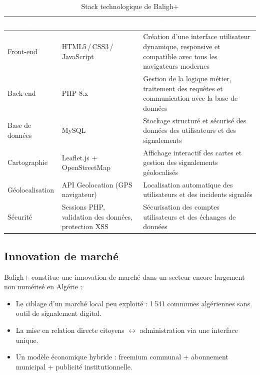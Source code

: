 \documentclass[12pt,a4paper]{report}
\newcommand{\thdcell}[1]{%
  \cellcolor{tabhead}\textbf{\textcolor{white}{#1}}%
}
\begin{document}
\begin{table}[H]
  \centering
  \caption{Stack technologique de Baligh+}
  \renewcommand{\arraystretch}{1.4}
  \begin{tabularx}{\linewidth}{lXX}
    \toprule
    \rowcolor{primary}
    \thdcell{Couche} & \thdcell{Technologie} & \thdcell{Justification} \\
    \midrule

    Front-end & HTML5\,/\,CSS3\,/\,JavaScript &
    Création d'une interface utilisateur dynamique, responsive et compatible
    avec tous les navigateurs modernes \\

    \rowcolor{lightgray}
    Back-end & PHP 8.x &
    Gestion de la logique métier, traitement des requêtes et communication
    avec la base de données \\

    Base de données & MySQL &
    Stockage structuré et sécurisé des données des utilisateurs et des
    signalements \\

    \rowcolor{lightgray}
    Cartographie & Leaflet.js + OpenStreetMap &
    Affichage interactif des cartes et gestion des signalements géolocalisés \\

    Géolocalisation & API Geolocation (GPS navigateur) &
    Localisation automatique des utilisateurs et des incidents signalés \\

    \rowcolor{lightgray}
    Sécurité & Sessions PHP, validation des données, protection XSS &
    Sécurisation des comptes utilisateurs et des échanges de données \\

    \bottomrule
  \end{tabularx}
\end{table}

\subsection{Innovation de marché}

Baligh+ constitue une innovation de marché dans un secteur encore largement
non numérisé en Algérie :

\begin{itemize}
  \item Le ciblage d'un marché local peu exploité : 1\,541 communes algériennes
        sans outil de signalement digital.
  \item La mise en relation directe citoyens $\leftrightarrow$ administration
        via une interface unique.
  \item Un modèle économique hybride : freemium communal + abonnement municipal
        + publicité institutionnelle.
\end{itemize}
\end{document}
